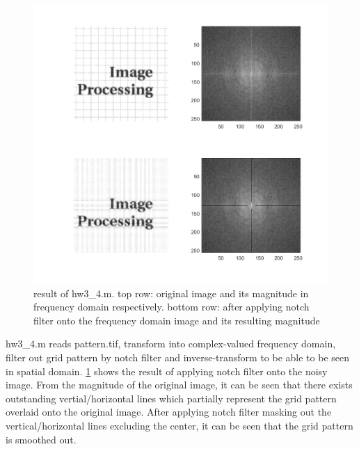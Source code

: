 \documentclass[extendedabs]{bmvc2k}
\begin{document}
\begin{figure}[h]
    \centering
    \includegraphics[width=\linewidth]{hw3_4_1}
    \caption{result of hw3\_4.m. top row: original image and its magnitude in frequency 
    domain respectively. bottom row: after applying notch filter onto the frequency domain image
    and its resulting magnitude}
    \label{fig:5}
\end{figure}

hw3\_4.m reads pattern.tif, transform into complex-valued frequency domain, filter out grid pattern
by notch filter and inverse-transform to be able to be seen in spatial domain. 
\figurename{\ref{fig:5}} shows the result of applying notch filter onto the noisy image.
From the magnitude of the original image, it can be seen that there exists outstanding
vertial/horizontal lines which partially represent the grid pattern overlaid onto the original
image. After applying notch filter masking out the vertical/horizontal lines excluding the center,
it can be seen that the grid pattern is smoothed out.
\end{document}
